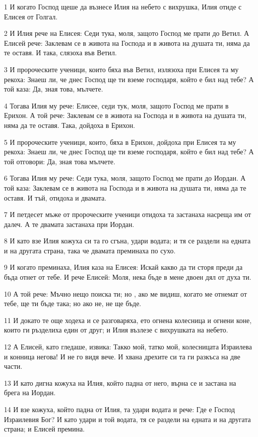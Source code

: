 \par 1 И когато Господ щеше да възнесе Илия на небето с вихрушка, Илия отиде с Елисея от Голгал.
\par 2 И Илия рече на Елисея: Седи тука, моля, защото Господ ме прати до Ветил. А Елисей рече: Заклевам се в живота на Господа и в живота на душата ти, няма да те оставя. И така, слязоха във Ветил.
\par 3 И пророческите ученици, които бяха във Ветил, излязоха при Елисея та му рекоха: Знаеш ли, че днес Господ ще ти вземе господаря, който е бил над тебе? А той каза: Да, зная това, мълчете.
\par 4 Тогава Илия му рече: Елисее, седи тук, моля, защото Господ ме прати в Ерихон. А той рече: Заклевам се в живота на Господа и в живота на душата ти, няма да те оставя. Така, дойдоха в Ерихон.
\par 5 И пророческите ученици, които, бяха в Ерихон, дойдоха при Елисея та му рекоха: Знаеш ли, че днес Господ ще ти вземе господаря, който е бил над тебе? А той отговори: Да, зная това мълчете.
\par 6 Тогава Илия му рече: Седи тука, моля, защото Господ ме прати до Иордан. А той каза: Заклевам се в живота на Господа и в живота на душата ти, няма да те оставя. И тъй, отидоха и двамата.
\par 7 И петдесет мъже от пророческите ученици отидоха та застанаха насреща им от далеч. А те двамата застанаха при Иордан.
\par 8 И като взе Илия кожуха си та го сгъна, удари водата; и тя се раздели на едната и на другата страна, така че двамата преминаха по сухо.
\par 9 И когато преминаха, Илия каза на Елисея: Искай какво да ти сторя преди да бъда отнет от тебе. И рече Елисей: Моля, нека бъде в мене двоен дял от духа ти.
\par 10 А той рече: Мъчно нещо поиска ти; но , ако ме видиш, когато ме отнемат от тебе, ще ти бъде така; но ако не, не ще бъде.
\par 11 И докато те още ходеха и се разговаряха, ето огнена колесница и огнени коне, които ги ръзделиха един от друг; и Илия възлезе с вихрушката на небето.
\par 12 А Елисей, като гледаше, извика: Такко мой, татко мой, колесницата Израилева и конница негова! И не го видя вече. И хвана дрехите си та ги разкъса на две части.
\par 13 И като дигна кожуха на Илия, който падна от него, върна се и застана на брега на Иордан.
\par 14 И взе кожуха, който падна от Илия, та удари водата и рече: Где е Господ Израилевия Бог? И като удари и той водата, тя се раздели на едната и на другата страна; и Елисей премина.
